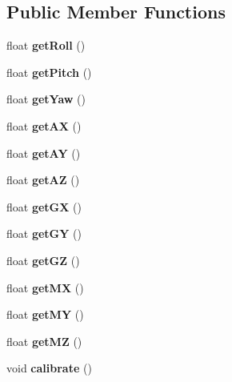 \subsection*{Public Member Functions}
\begin{DoxyCompactItemize}
\item 
\mbox{\label{class_i_m_u_ad1d78a07fc6b4a1e36ced1c376512710}} 
float {\bfseries get\+Roll} ()
\item 
\mbox{\label{class_i_m_u_a62628ef9d9418c9342fc474d575c2aaa}} 
float {\bfseries get\+Pitch} ()
\item 
\mbox{\label{class_i_m_u_a5a66528c1e6b6a80730a9ae880288611}} 
float {\bfseries get\+Yaw} ()
\item 
\mbox{\label{class_i_m_u_ab922483ebdc2032cf6801ed45d980a52}} 
float {\bfseries get\+AX} ()
\item 
\mbox{\label{class_i_m_u_ad934dd43df8b862c944a7607cf1fd5bc}} 
float {\bfseries get\+AY} ()
\item 
\mbox{\label{class_i_m_u_a0a0cebfe563d2ccfbdf39122ce703c08}} 
float {\bfseries get\+AZ} ()
\item 
\mbox{\label{class_i_m_u_a1e4f460df459755de52fe7143abdf69a}} 
float {\bfseries get\+GX} ()
\item 
\mbox{\label{class_i_m_u_afb91ddd6436ce75301ce2be523c66d78}} 
float {\bfseries get\+GY} ()
\item 
\mbox{\label{class_i_m_u_a8de1988b275a5c273f87569f60f8b228}} 
float {\bfseries get\+GZ} ()
\item 
\mbox{\label{class_i_m_u_a18860a539a96b26ced52aa26828c4ed7}} 
float {\bfseries get\+MX} ()
\item 
\mbox{\label{class_i_m_u_a2bb9d1d0affd6ed32d3c567738317c85}} 
float {\bfseries get\+MY} ()
\item 
\mbox{\label{class_i_m_u_a867b1a0bae57f6dc9c55bca0cf3f9c17}} 
float {\bfseries get\+MZ} ()
\item 
\mbox{\label{class_i_m_u_a2be1f7017e9a8747790ffd4a0d116f4c}} 
void {\bfseries calibrate} ()
\end{DoxyCompactItemize}
